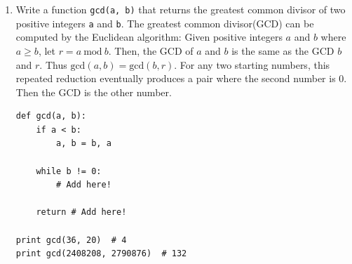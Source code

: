 \documentclass[../main.tex]{subfiles}
\begin{document}
\begin{enumerate}
\item Write a function \texttt{gcd(a, b)} that returns the greatest common divisor of two positive integers \texttt{a} and \texttt{b}.
The greatest common divisor(GCD) can be computed by the Euclidean algorithm:
Given positive integers $a$ and $b$ where $a \geq b$, let $r = a\ \mathrm{mod}\ b$.
Then, the GCD of $a$ and $b$ is the same as the GCD $b$ and $r$.
Thus $\mathrm{gcd}(a, b) = \mathrm{gcd}(b, r)$.
For any two starting numbers, this repeated reduction eventually produces a pair where the second number is 0.
Then the GCD is the other number.
\begin{verbatim}
def gcd(a, b):
    if a < b:
        a, b = b, a
    
    while b != 0:
        # Add here!
    
    return # Add here!

print gcd(36, 20)  # 4
print gcd(2408208, 2790876)  # 132
\end{verbatim}
\end{enumerate}
\end{document}
